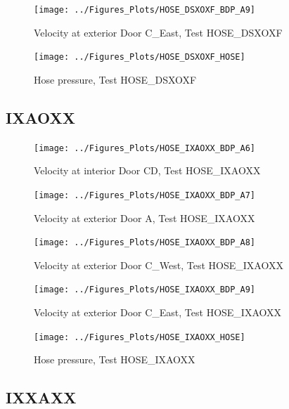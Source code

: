 \documentclass[11pt,oneside]{book}
\begin{document}
\begin{figure}[!ht]
\texttt{[image: ../Figures\_Plots/HOSE\_DSXOXF\_BDP\_A9]}
\caption{Velocity at exterior Door C\_East, Test HOSE\_DSXOXF}
\label{fig:HOSE_DSXOXF_BDP_A9}
\end{figure}

\begin{figure}[!ht]
\texttt{[image: ../Figures\_Plots/HOSE\_DSXOXF\_HOSE]}
\caption{Hose pressure, Test HOSE\_DSXOXF}
\label{fig:HOSE_DSXOXF_HOSE}
\end{figure}


\clearpage


\subsection{IXAOXX}

\begin{figure}[!ht]
\texttt{[image: ../Figures\_Plots/HOSE\_IXAOXX\_BDP\_A6]}
\caption{Velocity at interior Door CD, Test HOSE\_IXAOXX}
\label{fig:HOSE_IXAOXX_BDP_A6}
\end{figure}

\begin{figure}[!ht]
\texttt{[image: ../Figures\_Plots/HOSE\_IXAOXX\_BDP\_A7]}
\caption{Velocity at exterior Door A, Test HOSE\_IXAOXX}
\label{fig:HOSE_IXAOXX_BDP_A7}
\end{figure}

\begin{figure}[!ht]
\texttt{[image: ../Figures\_Plots/HOSE\_IXAOXX\_BDP\_A8]}
\caption{Velocity at exterior Door C\_West, Test HOSE\_IXAOXX}
\label{fig:HOSE_IXAOXX_BDP_A8}
\end{figure}

\begin{figure}[!ht]
\texttt{[image: ../Figures\_Plots/HOSE\_IXAOXX\_BDP\_A9]}
\caption{Velocity at exterior Door C\_East, Test HOSE\_IXAOXX}
\label{fig:HOSE_IXAOXX_BDP_A9}
\end{figure}

\begin{figure}[!ht]
\texttt{[image: ../Figures\_Plots/HOSE\_IXAOXX\_HOSE]}
\caption{Hose pressure, Test HOSE\_IXAOXX}
\label{fig:HOSE_IXAOXX_HOSE}
\end{figure}


\clearpage


\subsection{IXXAXX}
\end{document}
